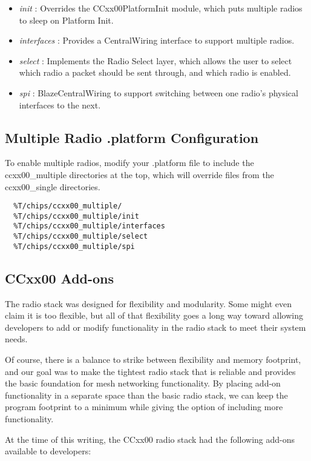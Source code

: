 \documentclass{article}
\begin{document}
\begin{itemize}
	\item \emph{init} : Overrides the CCxx00PlatformInit module, which puts multiple 
	radios to sleep on Platform Init.
	\item \emph{interfaces} : Provides a CentralWiring interface to support multiple 
	radios.
	\item \emph{select} : Implements the Radio Select layer, which allows the user to 
	select which radio a packet should be sent through, and which radio is enabled.
	\item \emph{spi} : BlazeCentralWiring to support switching between one 
	radio's physical interfaces to the next.
\end{itemize}

\subsection{Multiple Radio .platform Configuration}
To enable multiple radios, modify your .platform file to include the ccxx00\_multiple directories at the top, which will override files from the ccxx00\_single directories.

\begin{verbatim}
  %T/chips/ccxx00_multiple/
  %T/chips/ccxx00_multiple/init
  %T/chips/ccxx00_multiple/interfaces
  %T/chips/ccxx00_multiple/select
  %T/chips/ccxx00_multiple/spi
\end{verbatim}

\subsection{CCxx00 Add-ons}
\label{sec:ccxx00addons}
The radio stack was designed for flexibility and modularity. Some might even claim it is too flexible, but all of that flexibility goes a long way toward allowing developers to add or modify functionality in the radio stack to meet their system needs. 

Of course, there is a balance to strike between flexibility and memory footprint, and our goal was to make the tightest radio stack that is 
reliable and provides the basic foundation for mesh networking functionality. By placing add-on functionality in a separate space than the basic radio stack, we can keep the program footprint to a minimum while giving the option of including
more functionality.

At the time of this writing, the CCxx00 radio stack had the following add-ons available to developers:
\end{document}
